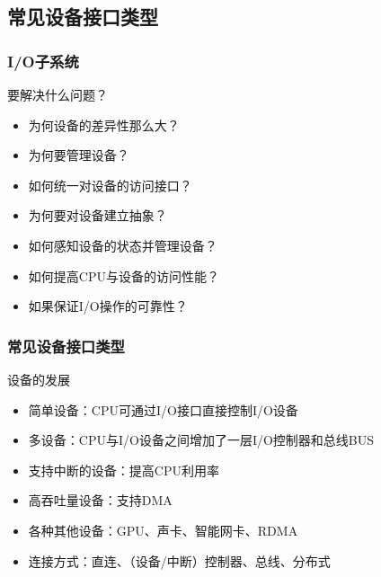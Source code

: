 \subsection{常见设备接口类型} %
\begin{frame}[fragile]
    \frametitle{I/O子系统}
    要解决什么问题？
    \begin{itemize}
        \item 为何设备的差异性那么大？
        \item 为何要管理设备？
        \item 如何统一对设备的访问接口？
        \item 为何要对设备建立抽象？
        \item 如何感知设备的状态并管理设备？
        \item 如何提高CPU与设备的访问性能？
        \item 如果保证I/O操作的可靠性？
    \end{itemize}
\end{frame}
\begin{frame}[fragile]
    \frametitle{常见设备接口类型}
    设备的发展
    \begin{itemize}
        \item 简单设备：CPU可通过I/O接口直接控制I/O设备
        \item 多设备：CPU与I/O设备之间增加了一层I/O控制器和总线BUS
        \item 支持中断的设备：提高CPU利用率
        \item 高吞吐量设备：支持DMA
        \item 各种其他设备：GPU、声卡、智能网卡、RDMA
        \item 连接方式：直连、（设备/中断）控制器、总线、分布式
    \end{itemize}
\end{frame}
